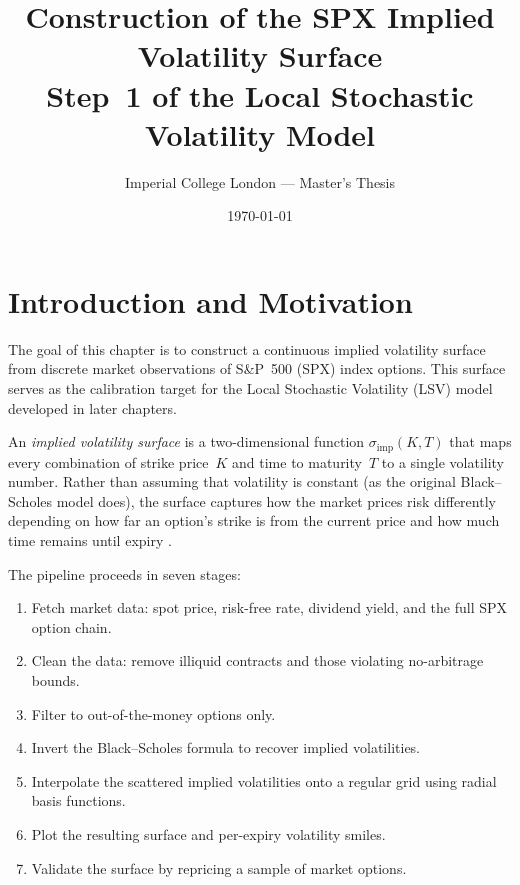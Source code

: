 \documentclass[12pt, a4paper]{article}
\title{Construction of the SPX Implied Volatility Surface\\[6pt]
       \large Step~1 of the Local Stochastic Volatility Model}
\author{Imperial College London --- Master's Thesis}
\date{\today}
\begin{document}
\maketitle
\tableofcontents
\newpage

\section{Introduction and Motivation}
\label{sec:intro}

The goal of this chapter is to construct a continuous implied volatility surface
from discrete market observations of S\&P~500 (SPX) index options. This surface
serves as the calibration target for the Local Stochastic Volatility (LSV) model
developed in later chapters.

An \emph{implied volatility surface} is a two-dimensional function
$\sigma_{\text{imp}}(K, T)$ that maps every combination of strike price~$K$ and
time to maturity~$T$ to a single volatility number. Rather than assuming that
volatility is constant (as the original Black--Scholes model does), the surface
captures how the market prices risk differently depending on how far an option's
strike is from the current price and how much time remains until expiry
\parencite{gatheral2006volatility, cont2002dynamics}.

The pipeline proceeds in seven stages:
\begin{enumerate}[nosep]
    \item Fetch market data: spot price, risk-free rate, dividend yield, and the
          full SPX option chain.
    \item Clean the data: remove illiquid contracts and those violating
          no-arbitrage bounds.
    \item Filter to out-of-the-money options only.
    \item Invert the Black--Scholes formula to recover implied volatilities.
    \item Interpolate the scattered implied volatilities onto a regular grid
          using radial basis functions.
    \item Plot the resulting surface and per-expiry volatility smiles.
    \item Validate the surface by repricing a sample of market options.
\end{enumerate}
\end{document}
